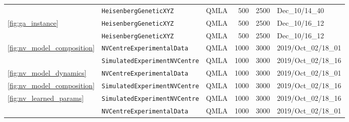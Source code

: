 \begin{tabular}{lllrrl}
                          & \texttt{HeisenbergGeneticXYZ} &                                     QMLA &                                      500 &                                     2500 &                           Dec\_10/14\_40 \\
\cline{1-6}
\multirow{2}{*}{\cref{fig:ga_instance}} & \texttt{HeisenbergGeneticXYZ} &                                     QMLA &                                      500 &                                     2500 &                           Dec\_10/16\_12 \\
                          & \texttt{HeisenbergGeneticXYZ} &                                     QMLA &                                      500 &                                     2500 &                           Dec\_10/16\_12 \\
\cline{1-6}
\multirow{2}{*}{\cref{fig:nv_model_composition}} & \texttt{NVCentreExperimentalData} &                                     QMLA &                                     1000 &                                     3000 &                      2019/Oct\_02/18\_01 \\
                          & \texttt{SimulatedExperimentNVCentre} &                                     QMLA &                                     1000 &                                     3000 &                      2019/Oct\_02/18\_16 \\
\cline{1-6}
\cref{fig:nv_model_dynamics} & \texttt{NVCentreExperimentalData} &                                     QMLA &                                     1000 &                                     3000 &                      2019/Oct\_02/18\_01 \\
\cref{fig:nv_model_composition} & \texttt{SimulatedExperimentNVCentre} &                                     QMLA &                                     1000 &                                     3000 &                      2019/Oct\_02/18\_16 \\
\multirow{2}{*}{\cref{fig:nv_learned_params}} & \texttt{SimulatedExperimentNVCentre} &                                     QMLA &                                     1000 &                                     3000 &                      2019/Oct\_02/18\_16 \\
                          & \texttt{NVCentreExperimentalData} &                                     QMLA &                                     1000 &                                     3000 &                      2019/Oct\_02/18\_01 \\
\cline{1-6}

\end{tabular}
